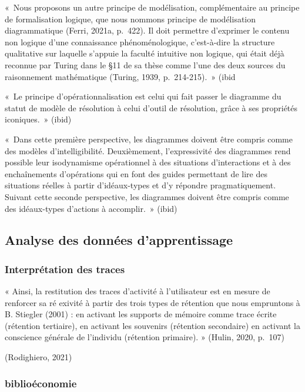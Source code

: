\documentclass[
  letterpaper,
  DIV=11,
  numbers=noendperiod]{scrreprt}
\begin{document}
«~Nous proposons un autre principe de modélisation, complémentaire au
principe de formalisation logique, que nous nommons principe de
modélisation diagrammatique (Ferri, 2021a, p.~422). Il doit permettre
d'exprimer le contenu non logique d'une connaissance phénoménologique,
c'est-à-dire la structure qualitative sur laquelle s'appuie la faculté
intuitive non logique, qui était déjà reconnue par Turing dans le §11 de
sa thèse comme l'une des deux sources du raisonnement mathématique
(Turing, 1939, p.~214-215).~» (ibid

«~Le principe d'opérationnalisation est celui qui fait passer le
diagramme du statut de modèle de résolution à celui d'outil de
résolution, grâce à ses propriétés iconiques.~» (ibid)

«~Dans cette première perspective, les diagrammes doivent être compris
comme des modèles d'intelligibilité. Deuxièmement, l'expressivité des
diagrammes rend possible leur isodynamisme opérationnel à des situations
d'interactions et à des enchaînements d'opérations qui en font des
guides permettant de lire des situations réelles à partir d'idéaux-types
et d'y répondre pragmatiquement. Suivant cette seconde perspective, les
diagrammes doivent être compris comme des idéaux-types d'actions à
accomplir.~» (ibid)

\hypertarget{analyse-des-donnuxe9es-dapprentissage}{%
\subsection{Analyse des données
d'apprentissage}\label{analyse-des-donnuxe9es-dapprentissage}}

\hypertarget{interpruxe9tation-des-traces}{%
\subsubsection{Interprétation des
traces}\label{interpruxe9tation-des-traces}}

« Ainsi, la restitution des traces d'activité à l'utilisateur est en
mesure de renforcer sa ré exivité à partir des trois types de rétention
que nous empruntons à B. Stiegler (2001) : en activant les supports de
mémoire comme trace écrite (rétention tertiaire), en activant les
souvenirs (rétention secondaire) en activant la conscience générale de
l'individu (rétention primaire). » (Hulin, 2020, p.~107)

(Rodighiero, 2021)

\hypertarget{bibliouxe9conomie}{%
\subsubsection{biblioéconomie}\label{bibliouxe9conomie}}
\end{document}
